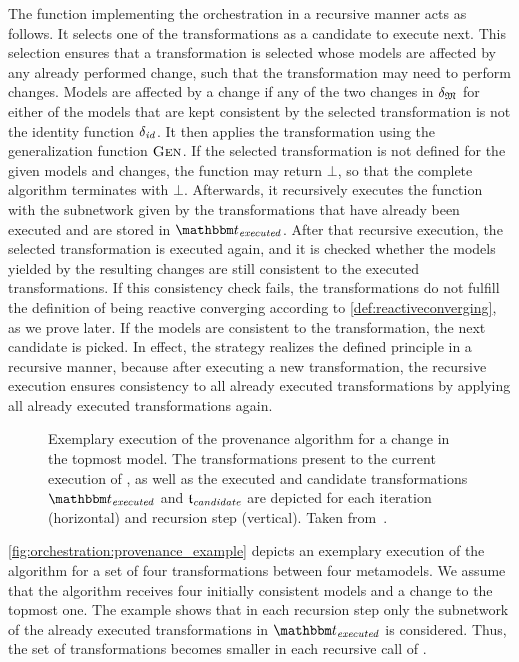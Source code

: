 The function  implementing the orchestration in a recursive manner acts as follows.
It selects one of the transformations as a candidate to execute next.
This selection ensures that a transformation is selected whose models are affected by any already performed change, such that the transformation may need to perform changes.
Models are affected by a change if any of the two changes in $\change{\metamodeltuple{M}}$ for either of the models that are kept consistent by the selected transformation is not the identity function $\delta_{\mathit{id}}$.
It then applies the transformation using the generalization function $\textsc{Gen}_{}$.
If the selected transformation is not defined for the given models and changes, the function may return $\bot$, so that the complete algorithm terminates with $\bot$.
Afterwards, it recursively executes the function  with the subnetwork given by the transformations that have already been executed and are stored in $\provalgexecuted$.
After that recursive execution, the selected transformation is executed again, and it is checked whether the models yielded by the resulting changes are still consistent to the executed transformations.
If this consistency check fails, the transformations do not fulfill the definition of being reactive converging according to \autoref{def:reactiveconverging}, as we prove later.
If the models are consistent to the transformation, the next candidate is picked.
In effect, the strategy realizes the defined principle in a recursive manner, because after executing a new transformation, the recursive execution ensures consistency to all already executed transformations by applying all already executed transformations again.

\begin{figure}
    \centering
    
    \caption[Exemplary execution of the provenance algorithm]{%
    Exemplary execution of the provenance algorithm for a change in the topmost model. 
    The transformations present to the current execution of , as well as the executed and candidate transformations $\provalgexecuted$ and $\provalgcandidate$ are depicted for each iteration (horizontal) and recursion step (vertical). Taken from~.
}
    \label{fig:orchestration:provenance_example}
\end{figure}

\autoref{fig:orchestration:provenance_example} depicts an exemplary execution of the  algorithm for a set of four transformations between four metamodels.
We assume that the algorithm receives four initially consistent models and a change to the topmost one.
The example shows that in each recursion step only the subnetwork of the already executed transformations in $\provalgexecuted$ is considered.
Thus, the set of transformations becomes smaller in each recursive call of .


